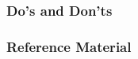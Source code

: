 {\begin{verbatim}
\end{verbatim}
}

\subsubsection{Do's and Don'ts}

\subsubsection{Reference Material}

